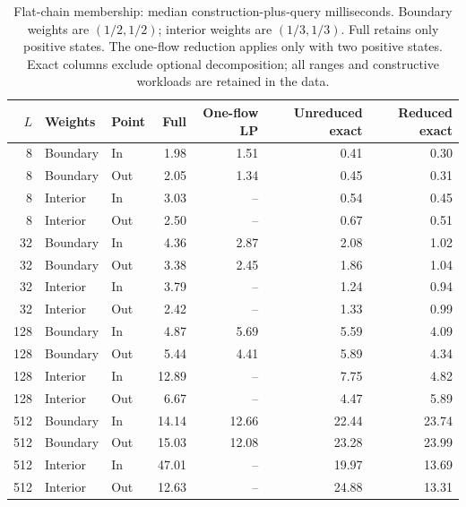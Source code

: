 \begin{table}[tb]\centering\small
\caption{Flat-chain membership: median construction-plus-query milliseconds. Boundary weights are $(1/2,1/2)$; interior weights are $(1/3,1/3)$. Full retains only positive states. The one-flow reduction applies only with two positive states. Exact columns exclude optional decomposition; all ranges and constructive workloads are retained in the data.}
\label{tab:computation-flat}
\begin{tabular}{rllrrrr}\toprule
$L$ & Weights & Point & Full & One-flow LP & Unreduced exact & Reduced exact\\\midrule
8 & Boundary & In & 1.98 & 1.51 & 0.41 & 0.30 \\
8 & Boundary & Out & 2.05 & 1.34 & 0.45 & 0.31 \\
8 & Interior & In & 3.03 & -- & 0.54 & 0.45 \\
8 & Interior & Out & 2.50 & -- & 0.67 & 0.51 \\
32 & Boundary & In & 4.36 & 2.87 & 2.08 & 1.02 \\
32 & Boundary & Out & 3.38 & 2.45 & 1.86 & 1.04 \\
32 & Interior & In & 3.79 & -- & 1.24 & 0.94 \\
32 & Interior & Out & 2.42 & -- & 1.33 & 0.99 \\
128 & Boundary & In & 4.87 & 5.69 & 5.59 & 4.09 \\
128 & Boundary & Out & 5.44 & 4.41 & 5.89 & 4.34 \\
128 & Interior & In & 12.89 & -- & 7.75 & 4.82 \\
128 & Interior & Out & 6.67 & -- & 4.47 & 5.89 \\
512 & Boundary & In & 14.14 & 12.66 & 22.44 & 23.74 \\
512 & Boundary & Out & 15.03 & 12.08 & 23.28 & 23.99 \\
512 & Interior & In & 47.01 & -- & 19.97 & 13.69 \\
512 & Interior & Out & 12.63 & -- & 24.88 & 13.31 \\
\bottomrule\end{tabular}\end{table}
